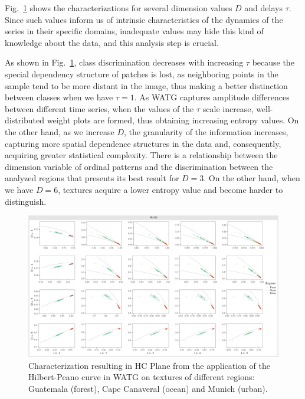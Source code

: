 \documentclass[journal]{IEEEtran}
\begin{document}
Fig.~\ref{fig:Regions} shows the characterizations for several dimension values $D$ and delays $\tau$.
Since such values inform us of intrinsic characteristics of the dynamics of the series in their specific domains, inadequate values may hide this kind of knowledge about the data, and this analysis step is crucial.

As shown in Fig.~\ref{fig:Regions}, class discrimination decreases with increasing $\tau$ because the special dependency structure of patches is lost, as neighboring points in the sample tend to be more distant in the image, thus making a better distinction between classes when we have $\tau = 1$.
As WATG captures amplitude differences between different time series, when the values of the $\tau$ scale increase, well-distributed weight plots are formed, thus obtaining increasing entropy values.
On the other hand, as we increase $D$, the granularity of the information increases, capturing more spatial dependence structures in the data and, consequently, acquiring greater statistical complexity.
There is a relationship between the dimension variable of ordinal patterns and the discrimination between the analyzed regions that presents its best result for $D = 3$.
On the other hand, when we have $D = 6$, textures acquire a lower entropy value and become harder to distinguish.
\begin{figure}
	\centering
	\includegraphics[width=1\textwidth]{Figures/WATGHC.pdf}
	\caption{Characterization resulting in HC Plane from the application of the Hilbert-Peano curve in WATG on textures of different regions: Guatemala (forest), Cape Canaveral (ocean) and Munich (urban).}
	\label{fig:Regions}
\end{figure}
\end{document}
